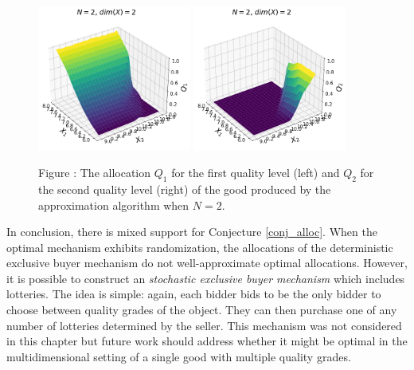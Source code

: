 \documentclass{article}
\newcounter{fig}
\begin{document}
\begin{figure}[H]
    \begin{center}
    \includegraphics[width=0.45\textwidth]{images/asymmetric_independent_belloni_Q1.png}
    \includegraphics[width=0.45\textwidth]{images/asymmetric_independent_belloni_Q2.png}
    \end{center}
    
    \vspace{1mm}
    \raggedright{\small {\sc Figure \thefig\label{fig:belloni_alloc_Q1}:} The allocation $Q_1$ for the first quality level (left) and $Q_2$ for the second quality level (right) of the good produced by the approximation algorithm when $N=2$.} 
\end{figure}

In conclusion, there is mixed support for Conjecture \ref{conj_alloc}. When the optimal mechanism exhibits randomization, the allocations of the deterministic exclusive buyer mechanism do not well-approximate optimal allocations. However, it is possible to construct an \textit{stochastic exclusive buyer mechanism} which includes lotteries. The idea is simple: again, each bidder bids to be the only bidder to choose between quality grades of the object. They can then purchase one of any number of lotteries determined by the seller. This mechanism was not considered in this chapter but future work should address whether it might be optimal in the multidimensional setting of a single good with multiple quality grades.
\end{document}
